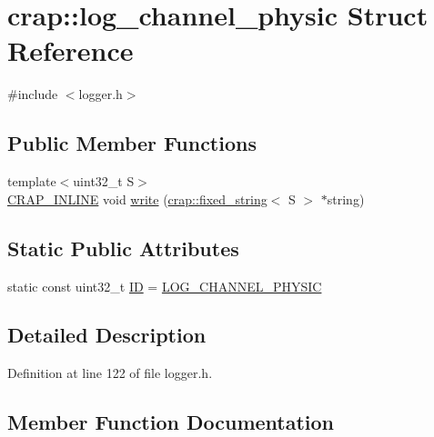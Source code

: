 \hypertarget{structcrap_1_1log__channel__physic}{}\section{crap\+:\+:log\+\_\+channel\+\_\+physic Struct Reference}
\label{structcrap_1_1log__channel__physic}


{\ttfamily \#include $<$logger.\+h$>$}

\subsection*{Public Member Functions}
\begin{DoxyCompactItemize}
\item 
{\footnotesize template$<$uint32\+\_\+t S$>$ }\\\hyperlink{config__x86_8h_a5a40526b8d842e7ff731509998bb0f1c}{C\+R\+A\+P\+\_\+\+I\+N\+L\+I\+N\+E} void \hyperlink{structcrap_1_1log__channel__physic_a2115c53dd4af1cddcc5594cbc42fafe7}{write} (\hyperlink{classcrap_1_1fixed__string}{crap\+::fixed\+\_\+string}$<$ S $>$ $\ast$string)
\end{DoxyCompactItemize}
\subsection*{Static Public Attributes}
\begin{DoxyCompactItemize}
\item 
static const uint32\+\_\+t \hyperlink{structcrap_1_1log__channel__physic_a3575423520f3ac125ee632a7408c06f7}{I\+D} = \hyperlink{logger_8h_a68deb1abc6a9c11b2ec7553cf6d47bf0}{L\+O\+G\+\_\+\+C\+H\+A\+N\+N\+E\+L\+\_\+\+P\+H\+Y\+S\+I\+C}
\end{DoxyCompactItemize}


\subsection{Detailed Description}


Definition at line 122 of file logger.\+h.



\subsection{Member Function Documentation}
\hypertarget{structcrap_1_1log__channel__physic_a2115c53dd4af1cddcc5594cbc42fafe7}{}
